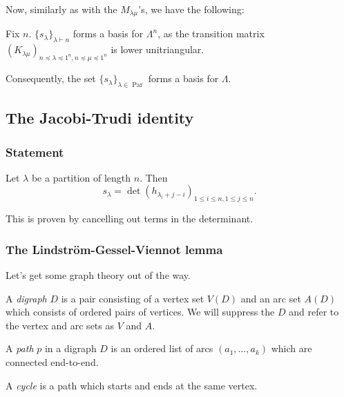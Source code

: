 \documentclass{article}
\DeclareMathOperator{\Par}{Par}
\begin{document}
Now, similarly as with the $M_{\lambda\mu}$'s, we have the following:

\begin{corollary}
    Fix $n$.
    $\{ s_\lambda \}_{\lambda \vdash n}$ forms a basis for $\Lambda^n$, as the transition matrix $(K_{\lambda\mu})_{n \preceq \lambda \preceq 1^n, n \preceq \mu \preceq 1^n}$ is lower unitriangular.

    Consequently, the set $\{s_\lambda\}_{\lambda \in \Par}$ forms a basis for $\Lambda$.
\end{corollary}


\subsection{The Jacobi-Trudi identity}

\subsubsection{Statement}

\begin{theorem} Let $\lambda$ be a partition of length $n$. Then
    \[
        s_\lambda 
        = 
        \det(h_{\lambda_i+j-i})_{1 \leq i \leq n, 1 \leq j \leq n}.
    \]
\end{theorem}

This is proven by cancelling out terms in the determinant.

\subsubsection{The Lindstr\"om-Gessel-Viennot lemma}

Let's get some graph theory out of the way.

\begin{definition} A \textit{digraph} $D$ is a pair consisting of a vertex set $V(D)$ and an arc set $A(D)$ which consists of ordered pairs of vertices. We will suppress the $D$ and refer to the vertex and arc sets as $V$ and $A$.
\end{definition}

\begin{definition}
    A \textit{path} $p$ in a digraph $D$ is an ordered list of arcs $(a_1, \ldots, a_k)$ which are connected end-to-end.
\end{definition}

\begin{definition}
    A \textit{cycle} is a path which starts and ends at the same vertex.
\end{definition}
\end{document}
